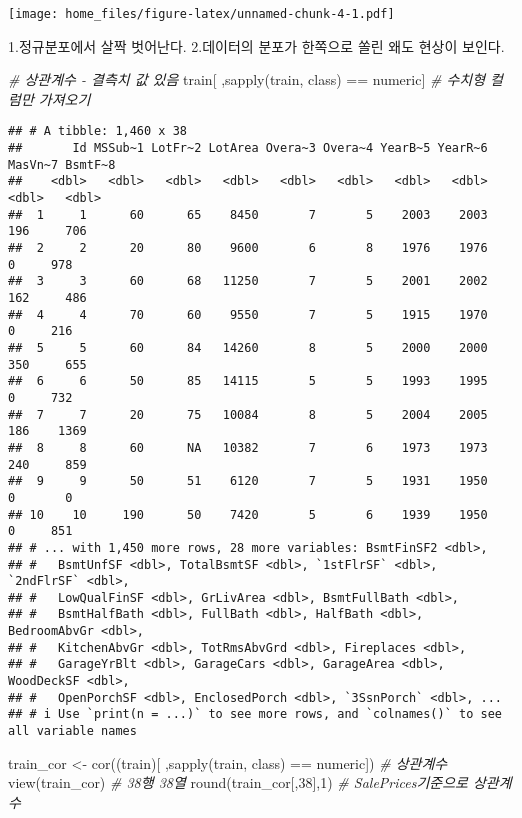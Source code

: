 \documentclass[
]{article}
\newenvironment{Shaded}{\begin{snugshade}}{\end{snugshade}}
\newcommand{\CommentTok}[1]{\textcolor[rgb]{0.56,0.35,0.01}{\textit{#1}}}
\newcommand{\DecValTok}[1]{\textcolor[rgb]{0.00,0.00,0.81}{#1}}
\newcommand{\FunctionTok}[1]{\textcolor[rgb]{0.00,0.00,0.00}{#1}}
\newcommand{\NormalTok}[1]{#1}
\newcommand{\OtherTok}[1]{\textcolor[rgb]{0.56,0.35,0.01}{#1}}
\newcommand{\SpecialCharTok}[1]{\textcolor[rgb]{0.00,0.00,0.00}{#1}}
\newcommand{\StringTok}[1]{\textcolor[rgb]{0.31,0.60,0.02}{#1}}
\begin{document}
\texttt{[image: home\_files/figure-latex/unnamed-chunk-4-1.pdf]}

1.정규분포에서 살짝 벗어난다. 2.데이터의 분포가 한쪽으로 쏠린 왜도
현상이 보인다.

\begin{Shaded}
\begin{Highlighting}[]
\CommentTok{\# 상관계수 {-} 결측치 값 있음 }
\NormalTok{train[ ,}\FunctionTok{sapply}\NormalTok{(train, class) }\SpecialCharTok{==} \StringTok{\textquotesingle{}numeric\textquotesingle{}}\NormalTok{] }\CommentTok{\# 수치형 컬럼만 가져오기 }
\end{Highlighting}
\end{Shaded}

\begin{verbatim}
## # A tibble: 1,460 x 38
##       Id MSSub~1 LotFr~2 LotArea Overa~3 Overa~4 YearB~5 YearR~6 MasVn~7 BsmtF~8
##    <dbl>   <dbl>   <dbl>   <dbl>   <dbl>   <dbl>   <dbl>   <dbl>   <dbl>   <dbl>
##  1     1      60      65    8450       7       5    2003    2003     196     706
##  2     2      20      80    9600       6       8    1976    1976       0     978
##  3     3      60      68   11250       7       5    2001    2002     162     486
##  4     4      70      60    9550       7       5    1915    1970       0     216
##  5     5      60      84   14260       8       5    2000    2000     350     655
##  6     6      50      85   14115       5       5    1993    1995       0     732
##  7     7      20      75   10084       8       5    2004    2005     186    1369
##  8     8      60      NA   10382       7       6    1973    1973     240     859
##  9     9      50      51    6120       7       5    1931    1950       0       0
## 10    10     190      50    7420       5       6    1939    1950       0     851
## # ... with 1,450 more rows, 28 more variables: BsmtFinSF2 <dbl>,
## #   BsmtUnfSF <dbl>, TotalBsmtSF <dbl>, `1stFlrSF` <dbl>, `2ndFlrSF` <dbl>,
## #   LowQualFinSF <dbl>, GrLivArea <dbl>, BsmtFullBath <dbl>,
## #   BsmtHalfBath <dbl>, FullBath <dbl>, HalfBath <dbl>, BedroomAbvGr <dbl>,
## #   KitchenAbvGr <dbl>, TotRmsAbvGrd <dbl>, Fireplaces <dbl>,
## #   GarageYrBlt <dbl>, GarageCars <dbl>, GarageArea <dbl>, WoodDeckSF <dbl>,
## #   OpenPorchSF <dbl>, EnclosedPorch <dbl>, `3SsnPorch` <dbl>, ...
## # i Use `print(n = ...)` to see more rows, and `colnames()` to see all variable names
\end{verbatim}

\begin{Shaded}
\begin{Highlighting}[]
\NormalTok{train\_cor }\OtherTok{\textless{}{-}} \FunctionTok{cor}\NormalTok{((train)[ ,}\FunctionTok{sapply}\NormalTok{(train, class) }\SpecialCharTok{==} \StringTok{\textquotesingle{}numeric\textquotesingle{}}\NormalTok{]) }\CommentTok{\# 상관계수 }
\FunctionTok{view}\NormalTok{(train\_cor) }\CommentTok{\# 38행 38열}
\FunctionTok{round}\NormalTok{(train\_cor[,}\DecValTok{38}\NormalTok{],}\DecValTok{1}\NormalTok{) }\CommentTok{\# SalePrices기준으로 상관계수}
\end{Highlighting}
\end{Shaded}
\end{document}
